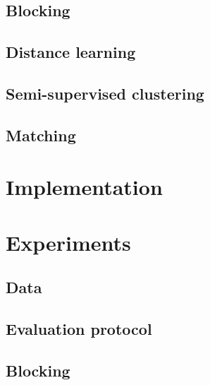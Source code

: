 \documentclass{article}
\begin{document}
\subsection{Blocking}

\subsection{Distance learning}

\subsection{Semi-supervised clustering}

\subsection{Matching}



\section{Implementation}
\label{implementation}



\section{Experiments}
\label{experiments}

\subsection{Data}

\subsection{Evaluation protocol}

\subsection{Blocking}
\end{document}
